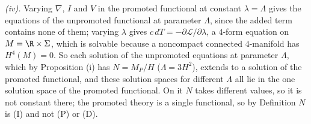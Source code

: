 \emph{(iv).} Varying $\nabla$, $I$ and $V$ in the promoted functional at constant $\lambda = \Lambda$ gives the equations of the unpromoted functional at parameter $\Lambda$, since the added term contains none of them; varying $\lambda$ gives $c\,dT = -\partial\mathcal{L}/\partial\lambda$, a $4$-form equation on $M = \R \times \Sigma$, which is solvable because a noncompact connected $4$-manifold has $H^{4}(M) = 0$. So each solution of the unpromoted equations at parameter $\Lambda$, which by Proposition (i) has $N = M_{P}/H$ ($\Lambda = 3H^{2}$), extends to a solution of the promoted functional, and these solution spaces for different $\Lambda$ all lie in the one solution space of the promoted functional. On it $N$ takes different values, so it is not constant there; the promoted theory is a single functional, so by Definition  $N$ is (I) and not (P) or (D).
